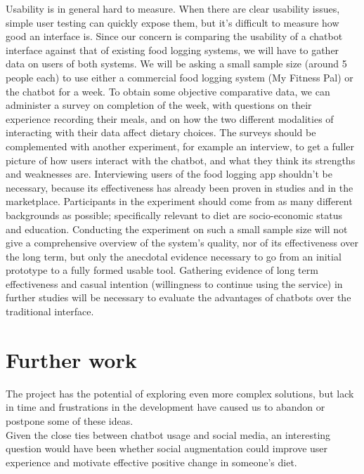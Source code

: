 \documentclass{scrartcl}
\begin{document}
Usability is in general hard to measure. When there are clear usability issues, simple user testing can quickly expose them, but it's difficult to measure how good an interface is. Since our concern is comparing the usability of a chatbot interface against that of existing food logging systems, we will have to gather data on users of both systems. We will be asking a small sample size (around 5 people each) to use either a commercial food logging system (My Fitness Pal) or the chatbot for a week. To obtain some objective comparative data, we can administer a survey on completion of the week, with questions on their experience recording their meals, and on how the two different modalities of interacting with their data affect dietary choices. The surveys should be complemented with another experiment, for example an interview, to get a fuller picture of how users interact with the chatbot, and what they think its strengths and weaknesses are. Interviewing users of the food logging app shouldn't be necessary, because its effectiveness has already been proven in studies and in the marketplace. Participants in the experiment should come from as many different backgrounds as possible; specifically relevant to diet are socio-economic status and education. Conducting the experiment on such a small sample size will not give a comprehensive overview of the system's quality, nor of its effectiveness over the long term, but only the anecdotal evidence necessary to go from an initial prototype to a fully formed usable tool. Gathering evidence of long term effectiveness and casual intention (willingness to continue using the service) in further studies will be necessary to evaluate the advantages of chatbots over the traditional interface.
\section*{Further work}
The project has the potential of exploring even more complex solutions, but lack in time and frustrations in the development have caused us to abandon or postpone some of these ideas. \\

Given the close ties between chatbot usage and social media, an interesting question would have been whether social augmentation could improve user experience and motivate effective positive change in someone's diet. \\
\end{document}
